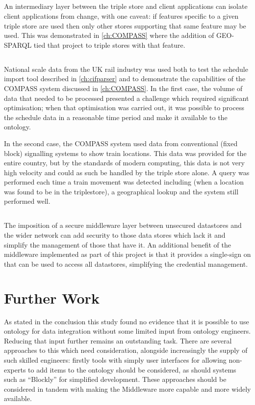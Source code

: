 \subsection{\QuestionChange}
An intermediary layer between the triple store and client applications can isolate client applications from change, with one caveat: if features specific to a given triple store are used then only other stores supporting that same feature may be used. This was demonstrated in \autoref{ch:COMPASS} where the addition of GEO-SPARQL tied that project to triple stores with that feature.

\subsection{\QuestionCanOntologyScale}
National scale data from the UK rail industry was used both to test the schedule import tool described in \autoref{ch:cifparser} and to demonstrate the capabilities of the COMPASS system discussed in \autoref{ch:COMPASS}. In the first case, the volume of data that needed to be processed presented a challenge which required significant optimisation; when that optimisation was carried out, it was possible to process the schedule data in a reasonable time period and make it available to the ontology. 

In the second case, the COMPASS system used data from conventional (fixed block) signalling systems to show train locations. This data was provided for the entire country, but by the standards of modern computing, this data is not very high velocity and could as such be handled by the triple store alone. A query was performed each time a train movement was detected including (when a location was found to be in the triplestore), a geographical lookup and the system still performed well.

\subsection{\QuestionSecurity}
The imposition of a secure middleware layer between unsecured datastores and the wider network can add security to those data stores which lack it and simplify the management of those that have it. An additional benefit of the middleware implemented as part of this project is that it provides a single-sign on that can be used to access all datastores, simplifying the credential management.

\section{Further Work}
As stated in the conclusion this study found no evidence that it is possible to use ontology for data integration without some limited input from ontology engineers. Reducing that input further remains an outstanding task. There are several approaches to this which need consideration, alongside increasingly the supply of such skilled engineers: firstly tools with simply user interfaces for allowing non-experts to add items to the ontology should be considered, as should systems such as \enquote{Blockly} for simplified development. These approaches should be considered in tandem with making the Middleware more capable and more widely available. 

